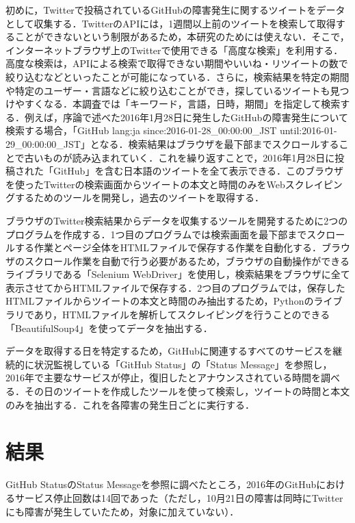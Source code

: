 \documentclass[uplatex,twocolumn]{jsarticle}
\begin{document}
初めに，Twitterで投稿されているGitHubの障害発生に関するツイートをデータとして収集する．TwitterのAPIには，1週間以上前のツイートを検索して取得することができないという制限があるため，本研究のためには使えない\cite{02}．そこで，インターネットブラウザ上のTwitterで使用できる「高度な検索」を利用する．高度な検索は，APIによる検索で取得できない期間やいいね・リツイートの数で絞り込むなどといったことが可能になっている．さらに，検索結果を特定の期間や特定のユーザー・言語などに絞り込むことができ，探しているツイートも見つけやすくなる．本調査では「キーワード，言語，日時，期間」を指定して検索する．例えば，序論で述べた2016年1月28日に発生したGitHubの障害発生について検索する場合，「GitHub lang:ja since:2016-01-28\_00:00:00\_JST until:2016-01-29\_00:00:00\_JST」となる．検索結果はブラウザを最下部までスクロールすることで古いものが読み込まれていく．これを繰り返すことで，2016年1月28日に投稿された「GitHub」を含む日本語のツイートを全て表示できる．このブラウザを使ったTwitterの検索画面からツイートの本文と時間のみをWebスクレイピングするためのツールを開発し，過去のツイートを取得する．

ブラウザのTwitter検索結果からデータを収集するツールを開発するために2つのプログラムを作成する．1つ目のプログラムでは検索画面を最下部までスクロールする作業とページ全体をHTMLファイルで保存する作業を自動化する．ブラウザのスクロール作業を自動で行う必要があるため，ブラウザの自動操作ができるライブラリである「Selenium WebDriver」を使用し，検索結果をブラウザに全て表示させてからHTMLファイルで保存する．2つ目のプログラムでは，保存したHTMLファイルからツイートの本文と時間のみ抽出するため，Pythonのライブラリであり，HTMLファイルを解析してスクレイピングを行うことのできる「BeautifulSoup4」を使ってデータを抽出する．

データを取得する日を特定するため，GitHubに関連するすべてのサービスを継続的に状況監視している「GitHub Status」の「Status Message」を参照し，2016年で主要なサービスが停止，復旧したとアナウンスされている時間を調べる．その日のツイートを作成したツールを使って検索し，ツイートの時間と本文のみを抽出する．これを各障害の発生日ごとに実行する．

\section{結果}
GitHub StatusのStatus Messageを参照に調べたところ，2016年のGitHubにおけるサービス停止回数は14回であった（ただし，10月21日の障害は同時にTwitterにも障害が発生していたため，対象に加えていない）．
\end{document}
